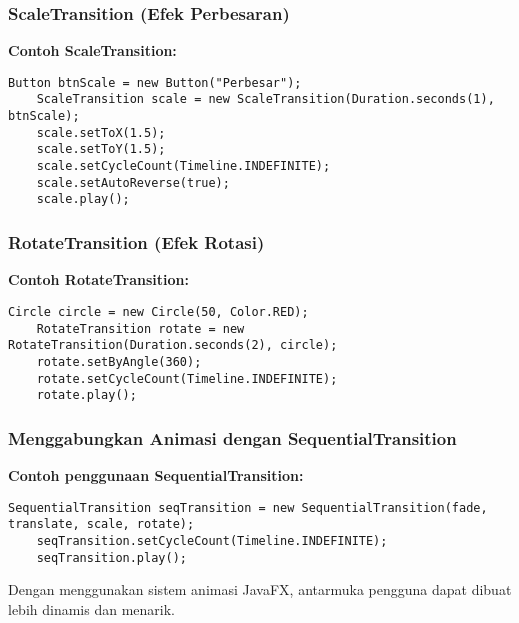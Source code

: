 \subsubsection{ScaleTransition (Efek Perbesaran)}

\textbf{Contoh ScaleTransition:}
\begin{lstlisting}[style=JavaStyle, caption=Mengubah ukuran elemen dalam JavaFX]
	Button btnScale = new Button("Perbesar");
	ScaleTransition scale = new ScaleTransition(Duration.seconds(1), btnScale);
	scale.setToX(1.5);
	scale.setToY(1.5);
	scale.setCycleCount(Timeline.INDEFINITE);
	scale.setAutoReverse(true);
	scale.play();
\end{lstlisting}

\subsubsection{RotateTransition (Efek Rotasi)}

\textbf{Contoh RotateTransition:}
\begin{lstlisting}[style=JavaStyle, caption=Memutar elemen dalam JavaFX]
	Circle circle = new Circle(50, Color.RED);
	RotateTransition rotate = new RotateTransition(Duration.seconds(2), circle);
	rotate.setByAngle(360);
	rotate.setCycleCount(Timeline.INDEFINITE);
	rotate.play();
\end{lstlisting}

\subsubsection{Menggabungkan Animasi dengan SequentialTransition}

\textbf{Contoh penggunaan SequentialTransition:}
\begin{lstlisting}[style=JavaStyle, caption=Menggabungkan beberapa animasi dalam JavaFX]
	SequentialTransition seqTransition = new SequentialTransition(fade, translate, scale, rotate);
	seqTransition.setCycleCount(Timeline.INDEFINITE);
	seqTransition.play();
\end{lstlisting}

Dengan menggunakan sistem animasi JavaFX, antarmuka pengguna dapat dibuat lebih dinamis dan menarik.




